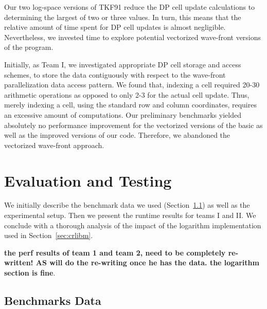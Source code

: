 \documentclass[runningheads,a4paper]{llncs}
\begin{document}

Our two log-space versions of TKF91 reduce the DP cell update calculations to determining the largest of two or three values. 
In turn, this means that the relative amount of time spent for DP cell updates is almost negligible. 
Nevertheless, we invested time to explore potential vectorized wave-front versions of the program.

Initially, as Team I, we investigated appropriate DP cell storage and access schemes, 
to store the data contiguously with respect to the wave-front parallelization data access pattern.
We found that, indexing a cell required 20-30 arithmetic operations as opposed to only 2-3 for the actual cell update.
Thus, merely indexing a cell, using the standard row and column coordinates, requires an excessive amount of computations. 
Our preliminary benchmarks yielded absolutely no performance improvement for the vectorized versions of 
the basic as well as the improved versions of our code.
Therefore, we abandoned the vectorized wave-front approach.


\section{Evaluation and Testing}
\label{sec:evaluation}

We initially describe the benchmark data we used (Section~\ref{ssec:benchmark}) as well as the experimental setup.
Then we present the runtime results for teams I and II. We conclude with a thorough analysis of the impact of the logarithm implementation used 
in Section~\ref{sec:crlibm}.

{\bf the perf results of team 1 and team 2, need to be completely re-written! AS will do the re-writing once he has the data. the logarithm section is fine}.

\subsection{Benchmarks Data}
\label{ssec:benchmark}

\end{document}
